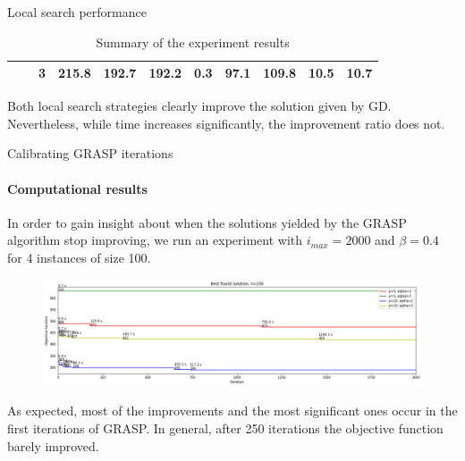 \documentclass{beamer}
\begin{document}
\begin{frame}{Local search performance}
\begin{table}
{\begin{tabular}{c|c|c|c|c|c|c|c|c|c|c}
                & & 3 &
                215.8 & 192.7 & 192.2 &
                0.3 & 97.1 & 109.8 &
                10.5 & 10.7 \\ \hline
            \end{tabular}
        }
        \caption{Summary of the experiment results}
        \label{tab:localsearch_exp}
    \end{table}
    
    Both local search strategies clearly improve the solution given by GD.
    Nevertheless, while time increases significantly, the improvement ratio does not.
\end{frame}

\begin{frame}{Calibrating GRASP iterations}
    \framesubtitle{Computational results}
    
    In order to gain insight about when the solutions yielded by the GRASP algorithm stop improving, we run an experiment with $i_{max} = 2000$ and $\beta = 0.4$ for 4 instances of size 100.
    
    \begin{figure}
        \centering
        \includegraphics[scale=0.29]{grasp_iters_n100}
    \end{figure}
    
    As expected, most of the improvements and the most significant ones occur in the first iterations of GRASP.
    In general, after 250 iterations the objective function barely improved.
\end{frame}
\end{document}
